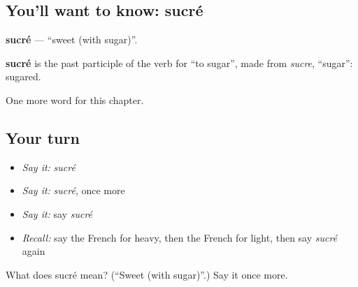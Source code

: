 \subsection*{You'll want to know: sucré}
\textbf{sucré} — \textquotedblleft{}sweet (with sugar)\textquotedblright{}.

\begin{cousinweb}
\textbf{sucré} is the past participle of the verb for \textquotedblleft{}to sugar\textquotedblright{}, made from \emph{sucre}, \textquotedblleft{}sugar\textquotedblright{}: sugared.
\end{cousinweb}

\begin{grammarlens}[title={What you've built}]
One more word for this chapter.
\end{grammarlens}

\subsection*{Your turn}
\begin{itemize}
\raggedright
  \item \emph{Say it:} \emph{sucré}
  \item \emph{Say it:} \emph{sucré}, once more
  \item \emph{Say it:} say \emph{sucré}
  \item \emph{Recall:} say the French for heavy, then the French for light, then say \emph{sucré} again
\end{itemize}

\begin{tcolorbox}[breakable,colback=teal!4,colframe=teal!35!black,title={Before you move on}]
What does sucré mean? (\textquotedblleft{}Sweet (with sugar)\textquotedblright{}.) Say it once more.
\end{tcolorbox}
